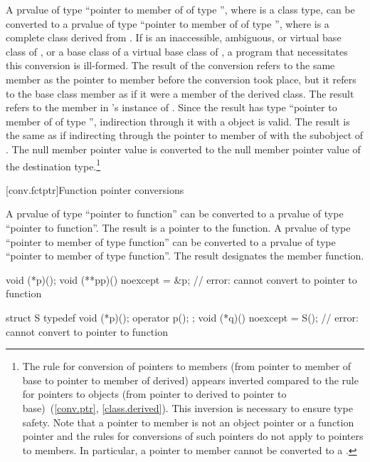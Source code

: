 \pnum
A prvalue of type ``pointer to member of  of type \cv{}
'', where  is a class type, can be converted to
a prvalue of type ``pointer to member of  of type \cv{}
'', where  is a complete class derived
from . If  is an
inaccessible,
ambiguous, or virtual base
class of , or a base class of a virtual base class of
, a program that necessitates this conversion is ill-formed.
The result of the conversion refers to the same member as the pointer to
member before the conversion took place, but it refers to the base class
member as if it were a member of the derived class. The result refers to
the member in 's instance of . Since the result has
type ``pointer to member of  of type \cv{} '',
indirection through it with a  object is valid. The result is the same
as if indirecting through the pointer to member of  with the
 subobject of . The null member pointer value is
converted to the null member pointer value of the destination
type.\footnote{The rule for conversion of pointers to members (from pointer to member
of base to pointer to member of derived) appears inverted compared to
the rule for pointers to objects (from pointer to derived to pointer to
base)~(\ref{conv.ptr}, \ref{class.derived}). This inversion is
necessary to ensure type safety. Note that a pointer to member is not
an object pointer or a function pointer
and the rules for conversions
of such pointers do not apply to pointers to members.
%
In particular, a pointer to member cannot be converted to a
.}

[conv.fctptr]{Function pointer conversions}

\pnum
{}%
A prvalue of type ``pointer to  function''
can be converted to a prvalue of type ``pointer to function''.
The result is a pointer to the function.
A prvalue of type ``pointer to member of type  function''
can be converted to a prvalue of type ``pointer to member of type function''.
The result designates the member function.

\begin{example}
\begin{codeblock}
void (*p)();
void (**pp)() noexcept = &p;    // error: cannot convert to pointer to  function

struct S { typedef void (*p)(); operator p(); };
void (*q)() noexcept = S();     // error: cannot convert to pointer to  function
\end{codeblock}
\end{example}

